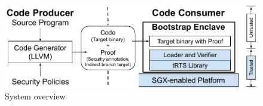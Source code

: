 \begin{figure}[htbp]
\centerline{\includegraphics[scale=0.45]{figures/fg-bootstrap-layer.pdf}}
\caption{System overview}\label{fg-overview}
\vspace{-12pt}
\end{figure}